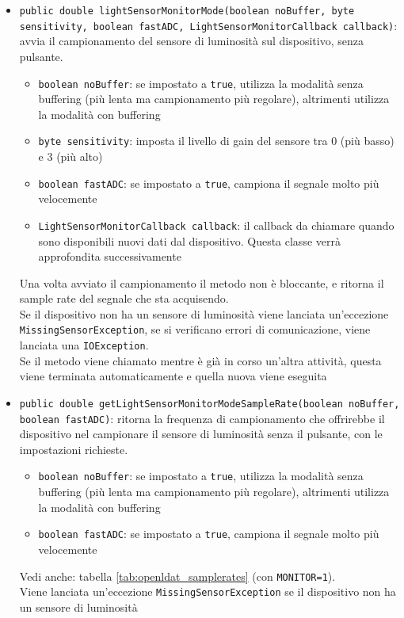 \begin{itemize}
	\item \texttt{public double lightSensorMonitorMode(boolean noBuffer, byte sensitivity, boolean fastADC, LightSensorMonitorCallback callback)}: avvia il campionamento del sensore di luminosità sul dispositivo, senza pulsante.\begin{itemize}
		\item \texttt{boolean noBuffer}: se impostato a \texttt{true}, utilizza la modalità senza buffering (più lenta ma campionamento più regolare), altrimenti utilizza la modalità con buffering
		\item \texttt{byte sensitivity}: imposta il livello di gain del sensore tra 0 (più basso) e 3 (più alto)
		\item \texttt{boolean fastADC}: se impostato a \texttt{true}, campiona il segnale molto più velocemente
		\item \texttt{LightSensorMonitorCallback callback}: il callback da chiamare quando sono disponibili nuovi dati dal dispositivo. Questa classe verrà approfondita successivamente
	\end{itemize}
	Una volta avviato il campionamento il metodo non è bloccante, e ritorna il sample rate del segnale che sta acquisendo.\\
	Se il dispositivo non ha un sensore di luminosità viene lanciata un'eccezione \texttt{MissingSensorException}, se si verificano errori di comunicazione, viene lanciata una \texttt{IOException}.\\
	Se il metodo viene chiamato mentre è già in corso un'altra attività, questa viene terminata automaticamente e quella nuova viene eseguita
	\item \texttt{public double getLightSensorMonitorModeSampleRate(boolean noBuffer, boolean fastADC)}: ritorna la frequenza di campionamento che offrirebbe il dispositivo nel campionare il sensore di luminosità senza il pulsante, con le impostazioni richieste.\begin{itemize}
		\item \texttt{boolean noBuffer}: se impostato a \texttt{true}, utilizza la modalità senza buffering (più lenta ma campionamento più regolare), altrimenti utilizza la modalità con buffering
		\item \texttt{boolean fastADC}: se impostato a \texttt{true}, campiona il segnale molto più velocemente
	\end{itemize}
	Vedi anche: tabella \ref{tab:openldat_samplerates} (con \texttt{MONITOR=1}).\\
	Viene lanciata un'eccezione \texttt{MissingSensorException} se il dispositivo non ha un sensore di luminosità

\end{itemize}
